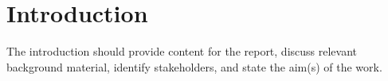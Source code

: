 
\chapter{Introduction}

The introduction should provide content for the report, discuss relevant background
material, identify stakeholders, and state the aim(s) of the work.
